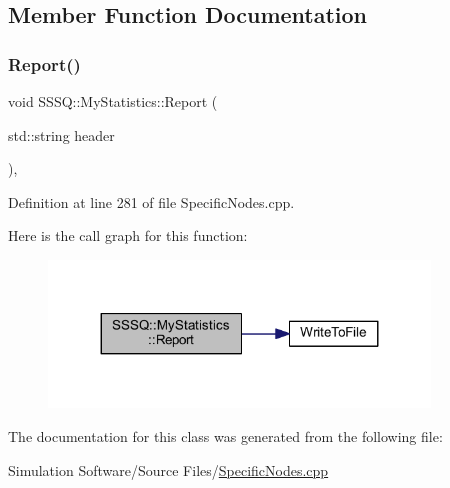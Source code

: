 \subsection{Member Function Documentation}
\mbox{\label{class_s_s_s_q_1_1_my_statistics_a6dec552109226c307ffbb81f45ec3eb9}} 
\subsubsection{\texorpdfstring{Report()}{Report()}}
{\footnotesize\ttfamily void S\+S\+S\+Q\+::\+My\+Statistics\+::\+Report (\begin{DoxyParamCaption}\item[{std\+::string}]{header }\end{DoxyParamCaption})\hspace{0.3cm}{\ttfamily [inline]}, {\ttfamily [override]}}



Definition at line 281 of file Specific\+Nodes.\+cpp.

Here is the call graph for this function\+:
\nopagebreak
\begin{figure}[H]
\begin{center}
\leavevmode
\includegraphics[width=287pt]{class_s_s_s_q_1_1_my_statistics_a6dec552109226c307ffbb81f45ec3eb9_cgraph}
\end{center}
\end{figure}


The documentation for this class was generated from the following file\+:\begin{DoxyCompactItemize}
\item 
Simulation Software/\+Source Files/\hyperlink{_specific_nodes_8cpp}{Specific\+Nodes.\+cpp}\end{DoxyCompactItemize}
